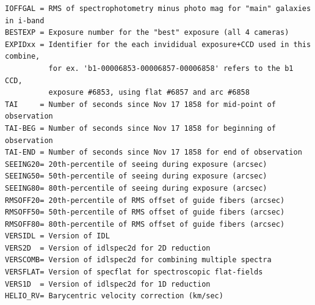 \documentclass[12pt,preprint]{aastex}
\begin{document}
\begin{verbatim}
IOFFGAL = RMS of spectrophotometry minus photo mag for "main" galaxies in i-band
BESTEXP = Exposure number for the "best" exposure (all 4 cameras)
EXPIDxx = Identifier for the each invididual exposure+CCD used in this combine,
          for ex. 'b1-00006853-00006857-00006858' refers to the b1 CCD,
          exposure #6853, using flat #6857 and arc #6858
TAI     = Number of seconds since Nov 17 1858 for mid-point of observation
TAI-BEG = Number of seconds since Nov 17 1858 for beginning of observation
TAI-END = Number of seconds since Nov 17 1858 for end of observation
SEEING20= 20th-percentile of seeing during exposure (arcsec)
SEEING50= 50th-percentile of seeing during exposure (arcsec)
SEEING80= 80th-percentile of seeing during exposure (arcsec)
RMSOFF20= 20th-percentile of RMS offset of guide fibers (arcsec)
RMSOFF50= 50th-percentile of RMS offset of guide fibers (arcsec)
RMSOFF80= 80th-percentile of RMS offset of guide fibers (arcsec)
VERSIDL = Version of IDL
VERS2D  = Version of idlspec2d for 2D reduction
VERSCOMB= Version of idlspec2d for combining multiple spectra
VERSFLAT= Version of specflat for spectroscopic flat-fields
VERS1D  = Version of idlspec2d for 1D reduction
HELIO_RV= Barycentric velocity correction (km/sec)
\end{verbatim}
\end{document}
